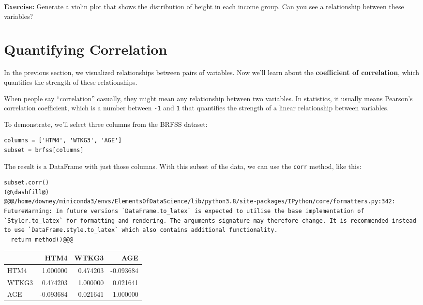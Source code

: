 \textbf{Exercise:} Generate a violin plot that shows the distribution of
height in each income group. Can you see a relationship between these
variables?

\hypertarget{quantifying-correlation}{%
\section{Quantifying Correlation}\label{quantifying-correlation}}

In the previous section, we visualized relationships between pairs of
variables. Now we'll learn about the \textbf{coefficient of
correlation}, which quantifies the strength of these relationships.

When people say ``correlation'' casually, they might mean any
relationship between two variables. In statistics, it usually means
Pearson's correlation coefficient, which is a number between
\passthrough{\lstinline!-1!} and \passthrough{\lstinline!1!} that
quantifies the strength of a linear relationship between variables.

To demonstrate, we'll select three columns from the BRFSS dataset:

\begin{lstlisting}[]
columns = ['HTM4', 'WTKG3', 'AGE']
subset = brfss[columns]
\end{lstlisting}

The result is a DataFrame with just those columns. With this subset of
the data, we can use the \passthrough{\lstinline!corr!} method, like
this:

\begin{lstlisting}[]
subset.corr()
(@\dashfill@)
@@@/home/downey/miniconda3/envs/ElementsOfDataScience/lib/python3.8/site-packages/IPython/core/formatters.py:342: FutureWarning: In future versions `DataFrame.to_latex` is expected to utilise the base implementation of `Styler.to_latex` for formatting and rendering. The arguments signature may therefore change. It is recommended instead to use `DataFrame.style.to_latex` which also contains additional functionality.
  return method()@@@
\end{lstlisting}

\begin{tabular}{lrrr}
\midrule
{} &      HTM4 &     WTKG3 &       AGE \\
\midrule
HTM4  &  1.000000 &  0.474203 & -0.093684 \\
WTKG3 &  0.474203 &  1.000000 &  0.021641 \\
AGE   & -0.093684 &  0.021641 &  1.000000 \\
\midrule
\end{tabular}

